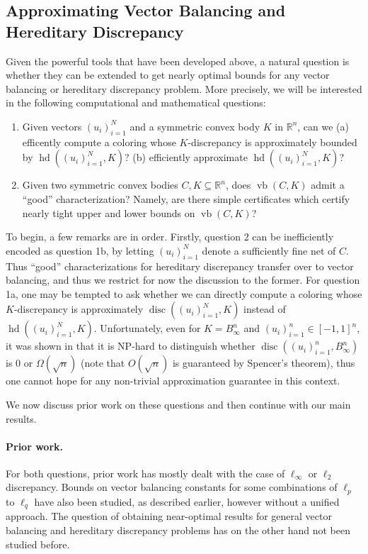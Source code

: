 \documentclass[11pt]{article}
\newcommand{\R}{{\mathbb{R}}}
\DeclareMathOperator{\disc}{disc}
\DeclareMathOperator{\hd}{hd}
\DeclareMathOperator{\vb}{vb}
\begin{document}
\subsection{Approximating Vector Balancing and Hereditary Discrepancy}

Given the powerful tools that have been developed above, a natural question is
whether they can be extended to get nearly optimal bounds for any vector
balancing or hereditary discrepancy problem. More precisely, we will be
interested in the following computational and mathematical questions: 

\begin{enumerate}
\item Given vectors $(u_i)_{i=1}^N$ and a symmetric convex body $K$ in $\R^n$,
can we (a) efficently compute a coloring whose $K$-discrepancy is approximately
bounded by $\hd((u_i)_{i=1}^N,K)$? (b) efficiently approximate $\hd((u_i)_{i=1}^N,K)$?
\item Given two symmetric convex bodies $C,K \subseteq \R^n$, does $\vb(C,K)$
admit a ``good'' characterization? Namely, are there simple certificates which
certify nearly tight upper and lower bounds on $\vb(C,K)$?
\end{enumerate}

To begin, a few remarks are in order.  Firstly, question 2 can be inefficiently
encoded as question 1b, by letting $(u_i)_{i=1}^N$ denote a sufficiently fine
net of $C$. Thus ``good'' characterizations for hereditary discrepancy transfer
over to vector balancing, and thus we restrict for now the discussion to the
former. For question 1a, one may be tempted to ask whether we can directly
compute a coloring whose $K$-discrepancy is approximately
$\disc((u_i)_{i=1}^N,K)$ instead of $\hd((u_i)_{i=1}^N,K)$. Unfortunately, even
for $K = B_\infty^n$ and $(u_i)_{i=1}^n \in [-1,1]^n$, it was shown in
\cite{CNN11} that it is NP-hard to
distinguish whether $\disc((u_i)_{i=1}^n,B_\infty^n)$ is $0$ or
$\Omega(\sqrt{n})$ (note that $O(\sqrt{n})$ is guaranteed by Spencer's theorem),
thus one cannot hope for any non-trivial approximation guarantee in this
context. 

We now discuss prior work on these questions and then continue with our
main results. 

\paragraph{Prior work.} For both questions, prior work has mostly dealt with the
case of $\ell_\infty$ or $\ell_2$ discrepancy. Bounds on vector balancing
constants for some combinations of $\ell_p$ to $\ell_q$ have also been studied,
as described earlier, however without a unified approach. The question of
obtaining near-optimal results for general vector balancing and hereditary
discrepancy problems has on the other hand not been studied before. 
\end{document}
